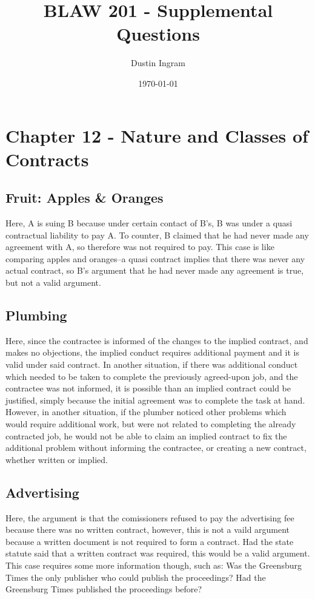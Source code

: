 \documentclass[11pt,a4paper]{article}
\title{BLAW 201 - Supplemental Questions}
\author{Dustin Ingram}
\date{\today}
\begin{document}
	\maketitle
	\section{Chapter 12 - Nature and Classes of Contracts}
    \subsection{Fruit: Apples \& Oranges}
      Here, A is suing B because under certain contact of B's, B was under a quasi contractual liability to pay A. To counter, B claimed that he had never made any agreement with A, so therefore was not required to pay. This case is like comparing apples and oranges--a quasi contract implies that there was never any actual contract, so B's argument that he had never made any agreement is true, but not a valid argument.
    \subsection{Plumbing}
      Here, since the contractee is informed of the changes to the implied contract, and makes no objections, the implied conduct requires additional payment and it is valid under said contract. In another situation, if there was additional conduct which needed to be taken to complete the previously agreed-upon job, and the contractee was not informed, it is possible than an implied contract could be justified, simply because the initial agreement was to complete the task at hand. However, in another situation, if the plumber noticed other problems which would require additional work, but were not related to completing the already contracted job, he would not be able to claim an implied contract to fix the additional problem without informing the contractee, or creating a new contract, whether written or implied.    
    \subsection{Advertising}
      Here, the argument is that the comissioners refused to pay the advertising fee because there was no written contract, however, this is not a vaild argument because a written document is not required to form a contract. Had the state statute said that a written contract was required, this would be a valid argument. This case requires some more information though, such as: Was the Greensburg Times the only publisher who could publish the proceedings? Had the Greensburg Times published the proceedings before?
\end{document}

